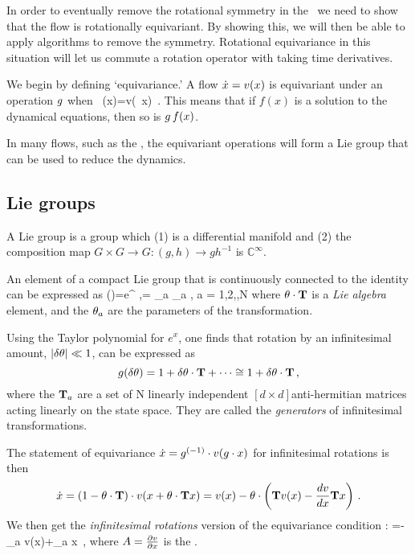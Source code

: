 {         
In order to eventually remove the rotational symmetry in the
\cLf\, we need to show that the flow is rotationally
equivariant. By showing this, we will then be able to apply
algorithms to remove the symmetry. Rotational equivariance in
this situation will let us commute a rotation operator with
taking time derivatives.

We begin by defining `equivariance.'
A flow $\dot{x}= v(x)$ is equivariant under an operation $g$ when
\beq
\LieEl \, \vel(x)=v(\LieEl \, x)
\,.
This means that if $f(x)$ is a solution to the dynamical equations, then so is $\LieEl\,f(x)$.

In many flows, such as the \cLe, the equivariant operations will form a Lie group that can be used to reduce the dynamics.

\subsection{Lie groups}

A Lie group is a group which (1) is a differential manifold and (2) the composition map $G \times G \rightarrow G : (g,h) \rightarrow g h^{-1}$ is $\mathbb{C}^\infty$.

An element of a compact Lie group that is continuously connected to the identity can be expressed as
\beq
\LieEl(\gSpace)=e^{{\gSpace} \cdot \Lg },\quad \gSpace \cdot \Lg = \sum \gSpace_a \Lg_a , a = 1,2,\cdots,N
where $\gSpace \cdot \Lg$ is a \emph{Lie algebra} element, and the $\gSpace_a$ are the parameters of the transformation.

Using the Taylor polynomial for $e^{x}$, one finds that rotation by an infinitesimal amount, $|\delta \gSpace| \ll 1$, can be expressed as
\[
\LieEl(\delta \gSpace)=1+\delta \gSpace \cdot \Lg  + \cdots \cong 1 + \delta \gSpace \cdot \Lg
\,,
\]
where the $\mathbf{T}_a$ are a set of N linearly independent $[d\times d]$anti-hermitian matrices acting linearly on the state space. They are called the \emph{generators} of infinitesimal transformations.

The statement of equivariance
$
\dot{x}=g^{(-1)} \cdot v(g \cdot x)
$
for infinitesimal rotations is then
\[
\dot{x}=(1-{\bf \theta} \cdot \mathbf{T} ) \cdot v(x+{\bf \theta} \cdot \mathbf{T}  x)
       =v(x)-{\bf \theta} \cdot \left(
            \mathbf{T} v(x) - \frac{dv}{dx} \mathbf{T} x
                     \right)
\,.
\]
We then get the {\em infinitesimal
rotations} version of the equivariance condition
:
=- \Lg_a v(x)+\Mvar \Lg_a x
\,,
\label{eq:InfnmslRot}
\eeq
where $A = \frac{\partial v}{\partial x}$ is the \stabmat.

}
